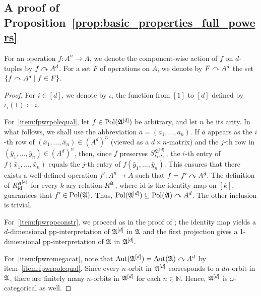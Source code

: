 \subsection{A proof of Proposition~\ref{prop:basic_properties_full_powers}}
For an operation $f\colon A^n \rightarrow A$, we denote the component-wise action of $f$ on $d$-tuples by $f\curvearrowright A^d$. For a set $F$ of operations on $A$, we denote by $F\curvearrowright A^d$ the set $\{f\curvearrowright A^d \mid  f\in F\}$. 
\fullpower*

    \begin{proof} For $i\in [d]$, we denote by $\iota_i$ the function from $[1]$ to $[d]$ defined by $\iota_i(1)\coloneqq i$.

        For~\eqref{item:fpwrpolequal}, let $f\in  \mathrm{Pol}({\mathfrak{A}}^{[d]})$ be arbitrary, and let $n$ be its arity.
        In what follows, we shall use the abbreviation $\bar{a}=(a_1,\dots,a_n)$.
        If $\bar{a}$ appears as the $i$-th row of $(\bar{x}_1,\dots,\bar{x}_n)\in (A^d)^n$ (viewed as a $d\times n$-matrix) and the $j$-th row in $(\bar{y}_1,\dots,\bar{y}_n)\in (A^d)^n$, then, since $f$ preserves $S^{{\mathfrak{A}}^{[d]}}_{\iota_i,\iota_j}$, the $i$-th entry of $f(\bar{x}_1,\dots,\bar{x}_n)$ equals the $j$-th entry of $f(\bar{y}_1,\dots,\bar{y}_n)$.
        This ensures that there exists a well-defined operation $f'\colon A^n\to A$ such that $f=f'\curvearrowright A^d$.
        The definition of $R^{{\mathfrak{A}}^{[d]}}_{\mathrm{id}}$ for every $k$-ary relation $R^{\mathfrak{A}}$, where $\mathrm{id}$ is the identity map on $[k]$, guarantees that $f'\in \mathrm{Pol}(\mathfrak{A})$.
        Thus, $\mathrm{Pol}({\mathfrak{A}}^{[d]})\subseteq\mathrm{Pol}(\mathfrak{A})\curvearrowright A^d$. 
        The other inclusion is trivial.
        
        For~\eqref{item:fpwrppconstr}, we proceed as in the proof of \cite[Lemma~3.5.4]{bodirsky2021complexity}; the identity map yields a $d$-dimensional pp-interpretation of ${\mathfrak{A}}^{[d]}$ in $\mathfrak{A}$ and the first projection gives a 1-dimensional pp-interpretation of $\mathfrak{A}$ in ${\mathfrak{A}}^{[d]}.$
        
        For~\eqref{item:fpwromegacat}, note that $\mathrm{Aut}({\mathfrak{A}}^{[d]})=\mathrm{Aut}(\mathfrak{A})\curvearrowright A^d$ by item~\eqref{item:fpwrpolequal}.
        Since every $n$-orbit in ${\mathfrak{A}}^{[d]}$ corresponds to a $dn$-orbit in $\mathfrak{A}$, there are finitely many $n$-orbits in ${\mathfrak{A}}^{[d]}$ for each $n\in \mathbb{N}$. 
        Hence, ${\mathfrak{A}}^{[d]}$ is $\omega$-categorical as well.
        

\end{proof}
